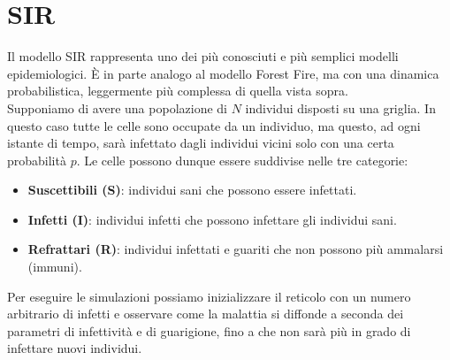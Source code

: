 \documentclass{article}
\begin{document}
    \section{SIR}
    Il modello SIR rappresenta uno dei più conosciuti e più semplici modelli epidemiologici.
    È in parte analogo al modello Forest Fire, ma con una dinamica probabilistica, leggermente più complessa di quella vista sopra.\\
    Supponiamo di avere una popolazione di $N$ individui disposti su una griglia. In questo caso tutte le celle sono
    occupate da un individuo, ma questo, ad ogni istante di tempo, sarà infettato dagli individui vicini solo con una certa probabilità $p$.
    Le celle possono dunque essere suddivise nelle tre categorie:
    \begin{itemize}
        \item \textbf{Suscettibili (S)}: individui sani che possono essere infettati.
        \item \textbf{Infetti (I)}: individui infetti che possono infettare gli individui sani.
        \item \textbf{Refrattari (R)}: individui infettati e guariti che non possono più ammalarsi (immuni).
    \end{itemize}
    Per eseguire le simulazioni possiamo inizializzare il reticolo con un numero arbitrario di infetti e osservare come la malattia si diffonde a
    seconda dei parametri di infettività e di guarigione, fino a che non sarà più in grado di infettare nuovi individui.
\end{document}
